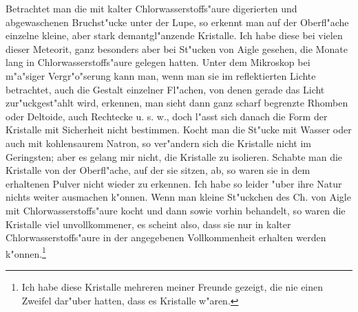 \documentclass[a4paper, 11pt, oneside, german]{article}
\begin{document}
Betrachtet man die mit kalter Chlorwasserstoffs"aure digerierten und abgewaschenen Bruchst"ucke unter der Lupe, so erkennt man auf der Oberfl"ache einzelne kleine, aber stark demantgl"anzende Kristalle. Ich habe diese bei vielen dieser Meteorit, ganz besonders aber bei St"ucken von Aigle gesehen, die Monate lang in Chlorwasserstoffs"aure gelegen hatten. Unter dem Mikroskop bei m"a"siger Vergr"o"serung kann man, wenn man sie im reflektierten Lichte betrachtet, auch die Gestalt einzelner Fl"achen, von denen gerade das Licht zur"uckgest"ahlt wird, erkennen, man sieht dann ganz scharf begrenzte Rhomben oder Deltoide, auch Rechtecke u. s. w., doch l"asst sich danach die Form der Kristalle mit Sicherheit nicht bestimmen. Kocht man die St"ucke mit Wasser oder auch mit kohlensaurem Natron, so ver"andern sich die Kristalle nicht im Geringsten; aber es gelang mir nicht, die Kristalle zu isolieren. Schabte man die Kristalle von der Oberfl"ache, auf der sie sitzen, ab, so waren sie in dem erhaltenen Pulver nicht wieder zu erkennen. Ich habe so leider "uber ihre Natur nichts weiter ausmachen k"onnen. Wenn man kleine St"uckchen des Ch. von Aigle mit Chlorwasserstoffs"aure kocht und dann sowie vorhin behandelt, so waren die Kristalle viel unvollkommener, es scheint also, dass sie nur in kalter Chlorwasserstoffs"aure in der angegebenen Vollkommenheit erhalten werden k"onnen.\footnote{Ich habe diese Kristalle mehreren meiner Freunde gezeigt, die nie einen Zweifel dar"uber hatten, dass es Kristalle w"aren.}
\end{document}
